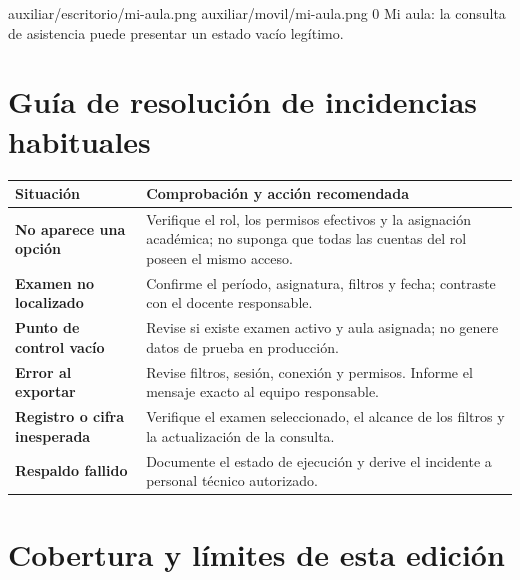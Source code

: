 \documentclass[11pt,a4paper]{article}
\begin{document}
\Pantallas
{auxiliar/escritorio/mi-aula.png}
{auxiliar/movil/mi-aula.png}
{0}
{Mi aula: la consulta de asistencia puede presentar
un estado vacío legítimo.}

\section{Guía de resolución de incidencias habituales}

{\small
\renewcommand{\arraystretch}{1.25}

\begin{tabularx}{\linewidth}{
 >{\raggedright\arraybackslash\bfseries}p{46mm}
 >{\raggedright\arraybackslash}X
}
\toprule
Situación & Comprobación y acción recomendada\\
\midrule

No aparece una opción &
Verifique el rol, los permisos efectivos y la asignación
académica; no suponga que todas las cuentas del rol poseen
el mismo acceso.\\

Examen no localizado &
Confirme el período, asignatura, filtros y fecha;
contraste con el docente responsable.\\

Punto de control vacío &
Revise si existe examen activo y aula asignada;
no genere datos de prueba en producción.\\

Error al exportar &
Revise filtros, sesión, conexión y permisos.
Informe el mensaje exacto al equipo responsable.\\

Registro o cifra inesperada &
Verifique el examen seleccionado, el alcance
de los filtros y la actualización de la consulta.\\

Respaldo fallido &
Documente el estado de ejecución y derive
el incidente a personal técnico autorizado.\\

\bottomrule
\end{tabularx}
}

\section{Cobertura y límites de esta edición}
\end{document}
